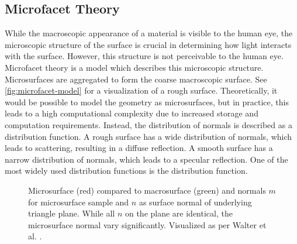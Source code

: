 \subsection{Microfacet Theory}

While the macroscopic appearance of a material is visible to the human eye, the microscopic structure of the surface is crucial in determining how light interacts with the surface. However, this structure is not perceivable to the human eye. Microfacet theory is a model which describes this microscopic structure. Microsurfaces are aggregated to form the coarse macroscopic surface. See \autoref{fig:microfacet-model} for a visualization of a rough surface. Theoretically, it would be possible to model the geometry as microsurfaces, but in practice, this leads to a high computational complexity due to increased storage and computation requirements. Instead, the distribution of normals is described as a distribution function. A rough surface has a wide distribution of normals, which leads to scattering, resulting in a diffuse reflection. A smooth surface has a narrow distribution of normals, which leads to a specular reflection. One of the most widely used distribution functions is the  distribution function. \cite{Pharr_Physically_Based_Rendering_2023}

\begin{figure}[H]
  \centering
  \caption{Microsurface (red) compared to macrosurface (green) and normals $m$ for microsurface sample and $n$ as surface normal of underlying triangle plane. While all $n$ on the plane are identical, the microsurface normal vary significantly. Visualized as per Walter et al. \cite{walter2007microfacet}.}
  \label{fig:microfacet-model}
\end{figure}

